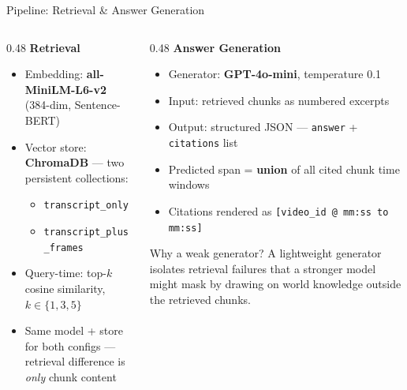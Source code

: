 \documentclass[aspectratio=169,t]{beamer}
\begin{document}
\begin{frame}{Pipeline: Retrieval \& Answer Generation}

\begin{columns}[T]
\begin{column}{0.48\textwidth}
  \textbf{Retrieval}
  \begin{itemize}
    \item Embedding: \textbf{all-MiniLM-L6-v2} (384-dim, Sentence-BERT)
    \item Vector store: \textbf{ChromaDB} — two persistent collections:
      \begin{itemize}
        \item \textcolor{c1blue}{\texttt{transcript\_only}}
        \item \textcolor{c2orange}{\texttt{transcript\_plus\_frames}}
      \end{itemize}
    \item Query-time: top-$k$ cosine similarity, $k \in \{1, 3, 5\}$
    \item Same model + store for both configs — retrieval difference is \emph{only} chunk content
  \end{itemize}
\end{column}
\begin{column}{0.48\textwidth}
  \textbf{Answer Generation}
  \begin{itemize}
    \item Generator: \textbf{GPT-4o-mini}, temperature 0.1
    \item Input: retrieved chunks as numbered excerpts
    \item Output: structured JSON — \texttt{answer} + \texttt{citations} list
    \item Predicted span = \textbf{union} of all cited chunk time windows
    \item Citations rendered as \texttt{[video\_id @ mm:ss to mm:ss]}
  \end{itemize}

  \medskip
  \begin{alertblock}{Why a weak generator?}
    A lightweight generator isolates retrieval failures that a stronger model might
    mask by drawing on world knowledge outside the retrieved chunks.
  \end{alertblock}
\end{column}
\end{columns}

\end{frame}
\end{document}
